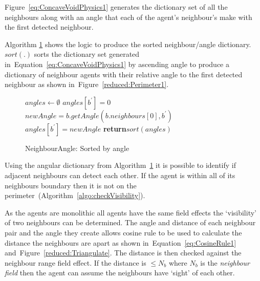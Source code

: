 \documentclass{ieeeaccess}
\begin{document}
Figure~\ref{eq:ConcaveVoidPhysics1} generates the dictionary set of all the neighbours along with an angle that each of the agent's neighbour's make with the first detected neighbour.

Algorithm \ref{algo:getNeighbourAngles} shows the logic to produce the sorted neighbour/angle dictionary. $sort(.)$ sorts the dictionary set generated in~Equation~\ref{eq:ConcaveVoidPhysics1} by ascending angle to produce a dictionary of neighbour agents with their relative angle to the first detected neighbour as shown in~Figure~\ref{reduced:Perimeter1}.

\begin{figure}
\begin{algorithmic}[1]
\State $angles \leftarrow \emptyset$
      \State $angles[b^{'}] = 0$
	\Else
		\State $newAngle = b.getAngle(b.neighbours[0], b^{'})$
	   \State $angles[b^{'}] = newAngle$
	\EndIf
\EndFor
\State \textbf{return}{$sort(angles)$} 
\EndProcedure
\end{algorithmic}
\caption{NeighbourAngle: Sorted by angle}
\label{algo:getNeighbourAngles}
\end{figure}

Using the angular dictionary from Algorithm~\ref{algo:getNeighbourAngles} it is possible to identify if adjacent neighbours can detect each other. If the agent is within all of its neighbours boundary then it is not on the perimeter~(Algorithm~\ref{algo:checkVisibility}). 

As the agents are monolithic all agents have the same field effects the `visibility' of two neighbours can be determined. The angle and distance of each neighbour pair and the angle they create allows cosine rule to be used to calculate the distance the neighbours are apart as shown in~Equation~\ref{eq:CosineRule1} and~Figure~\ref{reduced:Triangulate}. The distance is then checked against the neighbour range field effect. If the distance is $\leq N_b$ where $N_b$ is the \textit{neighbour field} then the agent can assume the neighbours have `sight' of each other. 

\end{document}

